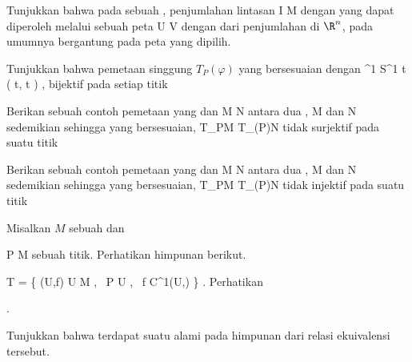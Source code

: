 {}
{

Tunjukkan bahwa pada sebuah
, penjumlahan lintasan
 { I } { M
} {}
dengan
 yang dapat diperoleh melalui sebuah peta
\maabbdisp {\alpha} { U } { V
} {}
dengan
 dari penjumlahan di $\R^n$, pada umumnya bergantung pada peta yang dipilih.

}
{} {}

{}
{

Tunjukkan bahwa pemetaan singgung $T_P(\varphi)$ yang bersesuaian dengan
\maabbeledisp {\varphi} {\R^1} {S^1
} { t } {( \cos  t, \sin  t  )
} {,}
bijektif pada setiap titik

}
{} {}

{}
{

Berikan sebuah contoh pemetaan yang
dan
\maabbdisp {\varphi} { M } { N
} {}
antara dua
,
\mathkor {} {M} {dan} {N} {}
sedemikian sehingga
yang bersesuaian,
 {T_PM} {T_{\varphi(P)}N
} {}
tidak surjektif pada suatu titik

}
{} {}

{}
{

Berikan sebuah contoh pemetaan yang
dan
\maabbdisp {\varphi} { M } { N
} {}
antara dua
,
\mathkor {} {M} {dan} {N} {}
sedemikian sehingga
yang bersesuaian,
 {T_PM} {T_{\varphi(P)}N
} {}
tidak injektif pada suatu titik

}
{} {}

{}
{

Misalkan $M$ sebuah
dan

\mavergleichskette
{\vergleichskette
{ P
}
{ \in }{ M
}
{  }{
}
{    }{
}
{   }{
}
}
{}{}{}
sebuah titik. Perhatikan himpunan berikut.

\mavergleichskettedisp
{\vergleichskette
{ T
}
{ =} { \left\{  (U,f)   \mid   U \subseteq M  , \,  P \in U   , \,  f \in C^1(U,\R)    \right\}
}
{ } {
}
{ } {
}
{ } {
}
}
{}{}{.}
Perhatikan

 { . }

 {Tunjukkan bahwa terdapat suatu
alami pada himpunan
dari relasi ekuivalensi tersebut.
}

}
{} {}

